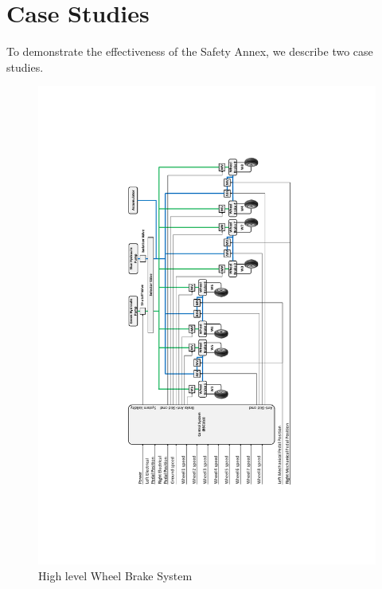 \section{Case Studies}
\label{sec:case_study}
To demonstrate the effectiveness of the Safety Annex, we describe two case studies.

\begin{figure}[!ht]
	\begin{center}
		\vspace{-50pt}
		\includegraphics[trim=20 20 20 20,clip,width=1.0\textwidth]{images/wbs_large.pdf}
		\vspace{-70pt}
		\caption{High level Wheel Brake System}
 		\label{fig:wbs1}
	\end{center}
\end{figure}

